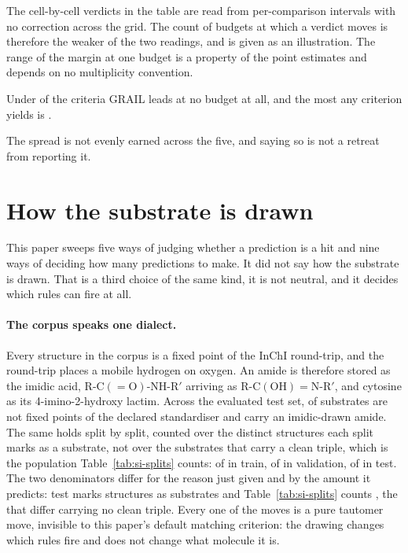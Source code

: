 \documentclass[journal=jcisd8,manuscript=suppinfo,layout=onecolumn]{achemso}
\begin{document}
The cell-by-cell verdicts in the table are read from per-comparison intervals with no correction
across the grid. The count of budgets at which a verdict moves is therefore the weaker of the two
readings, and is given as an illustration. The range of the margin at one budget is a property of
the point estimates and depends on no multiplicity convention.

Under
\numCritNeverLeadsWord{} of the \numCritCriteria{} criteria GRAIL leads at no budget at all, and
the most any criterion yields is \numCritLeadsBestWord{}.

The spread is not evenly earned across the five, and saying so is not a retreat from reporting it.
\section{How the substrate is drawn}
\label{sec:si-presentation}

This paper sweeps five ways of judging whether a prediction is a hit and nine ways of deciding how
many predictions to make. It did not say how the substrate is drawn. That is a third choice of the
same kind, it is not neutral, and it decides which rules can fire at all.

\paragraph{The corpus speaks one dialect.} Every structure in the corpus is a fixed point of the
InChI round-trip, and the round-trip places a mobile hydrogen on oxygen. An amide is therefore
stored as the imidic acid, $\mathrm{R\text{-}C(=O)\text{-}NH\text{-}R'}$ arriving as
$\mathrm{R\text{-}C(OH)=N\text{-}R'}$, and cytosine as its 4-imino-2-hydroxy lactim. Across the
evaluated test set, \numDialectEvalMoved{} of \numDialectEvalN{} substrates are not fixed points
of the declared standardiser and \numDialectEvalImidic{} carry an imidic-drawn amide. The same
holds split by split, counted over the distinct structures each split marks as a substrate, not
over the substrates that carry a clean triple, which is the population
Table~\ref{tab:si-splits} counts: \numDialectTrainMoved{} of \numDialectTrainN{} in train,
\numDialectValMoved{} of \numDialectValN{} in validation, \numDialectTestMoved{} of
\numDialectTestN{} in test. The two denominators differ for the reason just given and by the
amount it predicts: test marks \numDialectTestN{} structures as substrates and
Table~\ref{tab:si-splits} counts \numAssemblyTeststructures{}, the
\numAssemblyTestmarkednotripleWord{} that differ carrying no clean triple. Every one of the
\numDialectEvalMoved{} moves is a pure tautomer move,
invisible to this paper's default matching criterion: the drawing changes which rules fire and
does not change what molecule it is.
\end{document}
